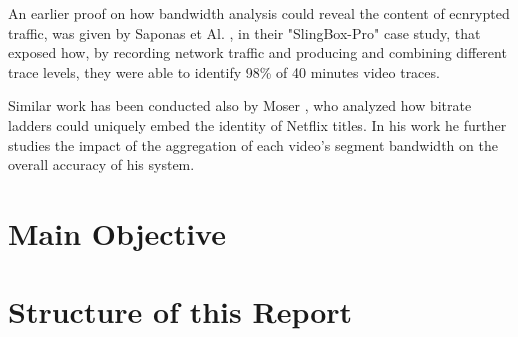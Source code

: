 An earlier proof on how bandwidth analysis could reveal the content of
ecnrypted traffic, was given by Saponas et Al. \cite{Saponas2007devices}, in
their "SlingBox-Pro" case study, that exposed how, by recording network traffic
and producing and combining different trace levels, they were able to identify
98\% of 40 minutes video traces.

Similar work has been conducted also by Moser \cite{moser}, who analyzed how
bitrate ladders could uniquely embed the identity of Netflix titles. In his
work he further studies the impact of the aggregation of each video's segment
bandwidth on the overall accuracy of his system. 

\section{Main Objective}\label{sec:objective}


\section{Structure of this Report}\label{sec:structure}


